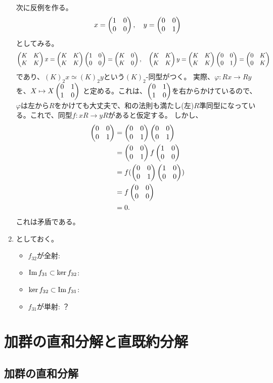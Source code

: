 \documentclass[9pt]{ltjsarticle}
\begin{document}
\begin{enumerate}[label=(問題\arabic*)]
次に反例を作る。
\begin{align}
  x = \tatev{1 & 0 \\ 0 & 0}, \quad
  y = \tatev{0 & 0 \\ 0 & 1}
\end{align}
としてみる。
\begin{align}
  \tatev{K & K \\ K & K}x
   =
   \tatev{K & K \\ K & K}\tatev{1 & 0 \\ 0 & 0}
   =
   \tatev{K & 0 \\ K & 0},\quad
   \tatev{K & K \\ K & K}y
    =
    \tatev{K & K \\ K & K}\tatev{0 & 0 \\ 0 & 1}
    =
    \tatev{0 & K \\ 0 & K}
\end{align}
であり、$(K)_2 x \simeq (K)_2 y$という$(K)_2$-同型がつく。
実際、$\varphi\colon Rx \to Ry$を、$X\mapsto X\tatev{0 & 1 \\ 1 & 0}$
と定める。これは、$\tatev{0 & 1 \\ 1 & 0}$を右からかけているので、
$\varphi$は左から$R$をかけても大丈夫で、和の法則も満たし(左)$R$準同型になっている。これで、同型$f\colon xR \to yR$があると仮定する。
しかし、
\begin{align}
  \tatev{0 & 0 \\ 0 & 1}
  &=
  \tatev{0 & 0 \\ 0 & 1}\tatev{0 & 0 \\ 0 & 1}\\
  &=
  \tatev{0 & 0 \\ 0 & 1}f\tatev{1 & 0 \\ 0 & 0}\\
  &=
  f(\tatev{0 & 0 \\ 0 & 1} \tatev{1 & 0 \\ 0 & 0})\\
  &=
  f\tatev{0 & 0 \\ 0 & 0}\\
  &=
  0.
\end{align}
これは矛盾である。

\item
{}
としておく。
\begin{itemize}
  \item $f_{32}$が全射:
  \item $\Image f_{31} \subset \ker f_{32}$:
  \item $\ker f_{32}\subset \Image f_{31}$:
  \item $f_{31}$が単射:
  ？
\end{itemize}

\end{enumerate}

\section{加群の直和分解と直既約分解}
\label{sec:加群の直和分解と直既約分解}
\subsection{加群の直和分解}
\label{sub:加群の直和分解}
\end{document}
